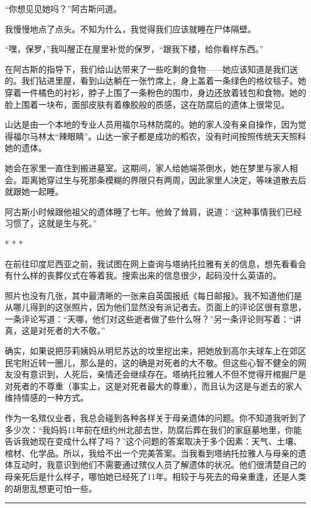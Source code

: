 \documentclass[12pt,oneside]{book}
\newcommand\hr{\par\noindent\hrule}
\begin{document}
“你想见见她吗？”阿古斯问道。

我慢慢地点了点头。不知为什么，我觉得我们应该就睡在尸体隔壁。

“嘿，保罗，”我叫醒正在屋里补觉的保罗，“跟我下楼，给你看样东西。”

在阿古斯的指导下，我们给山达带来了一些吃剩的食物——她应该知道是我们送的。我们钻进里屋，看到山达躺在一张竹席上，身上盖着一条绿色的格纹毯子。她穿着一件橘色的衬衫，脖子上围了一条粉色的围巾，身边还放着钱包和食物。她的脸上围着一块布，面部皮肤有着橡胶般的质感，这在防腐后的遗体上很常见。

山达是由一个本地的专业人员用福尔马林防腐的。她的家人没有亲自操作，因为觉得福尔马林太“辣眼睛”。山达一家子都是成功的稻农，没有时间按照传统天天照料她的遗体。

她会在家里一直住到搬进墓室。这期间，家人给她端茶倒水，她在梦里与家人相会。距离她穿过生与死那条模糊的界限只有两周，因此家里人决定，等味道散去后就跟她一起睡。

阿古斯小时候跟他祖父的遗体睡了七年。他耸了耸肩，说道：“这种事情我们已经习惯了，这就是生与死。”

\begin{center}
* * *
\end{center}

在前往印度尼西亚之前，我试图在网上查询与塔纳托拉雅有关的信息，想先看看会有什么样的丧葬仪式在等着我。搜索出来的信息很少，起码没什么英语的。

照片也没有几张，其中最清晰的一张来自英国报纸《每日邮报》。我不知道他们是从哪儿得到的这张照片，因为他们显然没有派记者去。页面上的评论区很有意思，一条评论写道：“天哪，他们对这些逝者做了些什么呀？”另一条评论则写着：“讲真，这是对死者的大不敬。”

确实，如果说把莎莉姨妈从明尼苏达的坟里挖出来，把她放到高尔夫球车上在郊区民宅附近转一圈儿，那么是的，这的确是对死者的大不敬。但这些心智不健全的网友没有意识到，人死后，亲情还会继续存在。塔纳托拉雅人不但不觉得开棺掘尸是对死者的不尊重（事实上，这是对死者最大的尊重），而且认为这是与逝去的家人维持情感的一种方式。

作为一名殡仪业者，我总会碰到各种各样关于母亲遗体的问题。你不知道我听到了多少次：“我妈妈11年前在纽约州北部去世，防腐后葬在我们的家庭墓地里，你能告诉我她现在变成什么样了吗？”这个问题的答案取决于多个因素：天气、土壤、棺材、化学品。所以，我给不出一个完美答案。当我看到塔纳托拉雅人与母亲的遗体互动时，我意识到他们不需要通过殡仪人员了解遗体的状况。他们很清楚自己的母亲死后是什么样子，哪怕她已经死了11年。相较于与死去的母亲重逢，还是人类的胡思乱想更可怕一些。


\hr 
\end{document}
